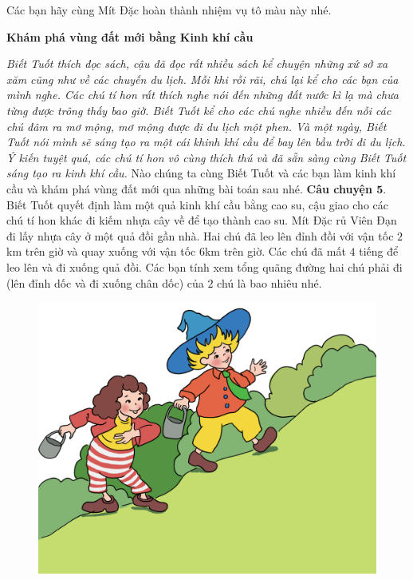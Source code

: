 	\vskip 0.1cm
	Các bạn hãy cùng Mít Đặc hoàn thành nhiệm vụ tô màu này nhé.
	\begin{center}
	\end{center}
	\centerline{\textbf{\color{toancuabi}Khám phá vùng đất mới bằng Kinh khí cầu}}
	\vskip 0.1cm
	\textit{Biết Tuốt thích đọc sách, cậu đã đọc rất nhiều sách kể chuyện những xứ sở xa xăm cũng như về các chuyến du lịch. Mỗi khi rỗi rãi, chú lại kể cho các bạn của mình nghe. Các chú tí hon rất thích nghe nói đến những đất nước kì lạ mà chưa từng được trông thấy bao giờ. Biết Tuốt kể cho các chú nghe nhiều đến nỗi các chú đâm ra mơ mộng, mơ mộng được đi du lịch một phen. Và một ngày, Biết Tuốt nói mình sẽ sáng tạo ra một cái khinh khí cầu để bay lên bầu trời đi du lịch. Ý kiến tuyệt quá, các chú tí hon vô cùng thích thú và đã sẵn sàng cùng Biết Tuốt sáng tạo ra kinh khí cầu.}
	\vskip 0.1cm
	Nào chúng ta cùng Biết Tuốt và các bạn làm kinh khí cầu và khám phá vùng đất mới qua những bài toán sau nhé.
	\vskip 0.1cm
	\textbf{\color{toancuabi}Câu chuyện $\pmb{5.}$} Biết Tuốt quyết định làm một quả kinh khí cầu bằng cao su, cậu giao cho các chú tí hon khác đi kiếm nhựa cây về để tạo thành cao su. Mít Đặc rủ Viên Đạn đi lấy nhựa cây ở một quả đồi gần nhà. Hai chú đã leo lên đỉnh đồi với vận tốc $2$km trên giờ và quay xuống với vận tốc $6$km trên giờ. Các chú đã mất $4$ tiếng để leo lên và đi xuống quả đồi. Các bạn tính xem tổng quãng đường hai chú phải đi (lên đỉnh dốc và đi xuống chân dốc) của $2$ chú là bao nhiêu nhé.
		\begin{figure}[H]
		\centering
		\vspace*{-5pt}
		\captionsetup{labelformat= empty, justification=centering}
		\includegraphics[width=0.5\linewidth]{Hinh8_LayNhua}
		\vspace*{-10pt}
	\end{figure}
